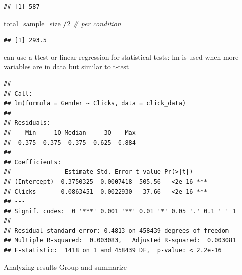 \documentclass[]{book}
\newenvironment{Shaded}{\begin{snugshade}}{\end{snugshade}}
\newcommand{\CommentTok}[1]{\textcolor[rgb]{0.56,0.35,0.01}{\textit{#1}}}
\newcommand{\DataTypeTok}[1]{\textcolor[rgb]{0.13,0.29,0.53}{#1}}
\newcommand{\DecValTok}[1]{\textcolor[rgb]{0.00,0.00,0.81}{#1}}
\newcommand{\KeywordTok}[1]{\textcolor[rgb]{0.13,0.29,0.53}{\textbf{#1}}}
\newcommand{\NormalTok}[1]{#1}
\newcommand{\OperatorTok}[1]{\textcolor[rgb]{0.81,0.36,0.00}{\textbf{#1}}}
\newcommand{\StringTok}[1]{\textcolor[rgb]{0.31,0.60,0.02}{#1}}
\begin{document}
\begin{verbatim}
## [1] 587
\end{verbatim}

\begin{Shaded}
\begin{Highlighting}[]
\NormalTok{total_sample_size }\OperatorTok{/}\DecValTok{2} \CommentTok{# per condition}
\end{Highlighting}
\end{Shaded}

\begin{verbatim}
## [1] 293.5
\end{verbatim}

can use a ttest or linear regression for statistical tests:
lm is used when more variables are in data but similar to t-test

\begin{Shaded}
\end{Shaded}

\begin{verbatim}
## 
## Call:
## lm(formula = Gender ~ Clicks, data = click_data)
## 
## Residuals:
##    Min     1Q Median     3Q    Max 
## -0.375 -0.375 -0.375  0.625  0.884 
## 
## Coefficients:
##               Estimate Std. Error t value Pr(>|t|)    
## (Intercept)  0.3750325  0.0007418  505.56   <2e-16 ***
## Clicks      -0.0863451  0.0022930  -37.66   <2e-16 ***
## ---
## Signif. codes:  0 '***' 0.001 '**' 0.01 '*' 0.05 '.' 0.1 ' ' 1
## 
## Residual standard error: 0.4813 on 458439 degrees of freedom
## Multiple R-squared:  0.003083,	Adjusted R-squared:  0.003081 
## F-statistic:  1418 on 1 and 458439 DF,  p-value: < 2.2e-16
\end{verbatim}

\begin{Shaded}
\end{Shaded}

Analyzing results
Group and summarize

\begin{Shaded}
\end{Shaded}
\end{document}
